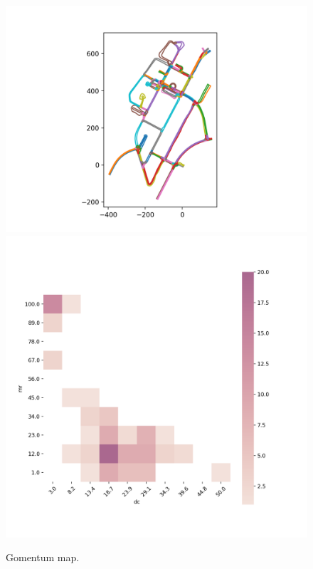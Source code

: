 \documentclass[conference]{IEEEtran}
\begin{document}
\begin{figure}[p]
%
  \includegraphics[width=\linewidth]{images/map_gomentum}
  \includegraphics[width=\linewidth]{images/feature_gomentum}
  \caption{Gomentum map.}
    \label{fig:feature-maps-gomentum}
\endminipage\hfill
{}%

\end{figure}
\end{document}
